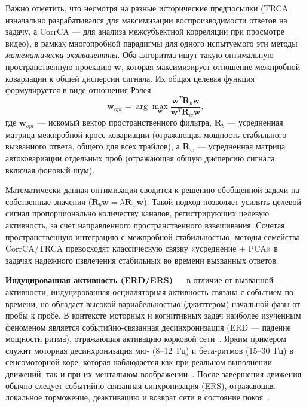 Важно отметить, что несмотря на разные исторические предпосылки (TRCA изначально разрабатывался для максимизации воспроизводимости ответов на задачу, а CorrCA --- для анализа межсубъектной корреляции при просмотре видео), в рамках многопробной парадигмы для одного испытуемого эти методы \textit{математически эквивалентны}. Оба алгоритма ищут такую оптимальную пространственную проекцию $\mathbf{w}$, которая максимизирует отношение межпробной ковариации к общей дисперсии сигнала. Их общая целевая функция формулируется в виде отношения Рэлея:
\begin{equation}
	\mathbf{w}_{opt} = \arg\max_{\mathbf{w}} \frac{\mathbf{w}^T \mathbf{R}_b \mathbf{w}}{\mathbf{w}^T \mathbf{R}_w \mathbf{w}},
\end{equation}
где $\mathbf{w}_{opt}$ --- искомый вектор пространственного фильтра, $\mathbf{R}_b$ --- усредненная матрица межпробной кросс-ковариации (отражающая мощность стабильного вызванного ответа, общего для всех трайлов), а $\mathbf{R}_w$ --- усредненная матрица автоковариации отдельных проб (отражающая общую дисперсию сигнала, включая фоновый шум).

Математически данная оптимизация сводится к решению обобщенной задачи на собственные значения ($\mathbf{R}_b \mathbf{w} = \lambda \mathbf{R}_w \mathbf{w}$). Такой подход позволяет усилить целевой сигнал пропорционально количеству каналов, регистрирующих целевую активность, за счет направленного пространственного взвешивания. Сочетая пространственную интеграцию с межпробной стабильностью, методы семейства CorrCA/TRCA превосходят классическую связку «усреднение + PCA» в задачах надежного извлечения стабильных во времени вызванных ответов.

\textbf{Индуцированная активность (ERD/ERS)} --- в отличие от вызванной активности, индуцированная осцилляторная активность связана с событием по времени, но обладает высокой вариабельностью (джиттером) начальной фазы от пробы к пробе. В контексте моторных и когнитивных задач наиболее изученным феноменом является событийно-связанная десинхронизация (ERD --- падение мощности ритма), отражающая активацию корковой сети~\cite{pfurtscheller1999event, klimesch2012alpha}. Ярким примером служит моторная десинхронизация мю- (8--12~Гц) и бета-ритмов (15--30~Гц) в сенсомоторной коре, которая наблюдается как при реальном выполнении движений, так и при их ментальном воображении~\cite{hari1997human, neuper2006motor}. После завершения движения обычно следует событийно-связанная синхронизация (ERS), отражающая локальное торможение, деактивацию и возврат сети в состояние покоя~\cite{pfurtscheller2005beta}.

